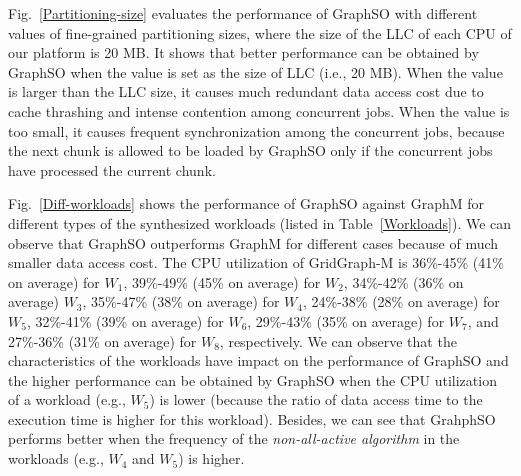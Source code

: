 \documentclass[10pt,journal,compsoc]{IEEEtran}
\begin{document}
Fig.~\ref{Partitioning-size} evaluates the performance of GraphSO with different values of fine-grained partitioning sizes, where the size of the LLC of each CPU of our platform is 20 MB. It shows that better performance can be obtained by GraphSO when the value is set as the size of LLC (i.e., 20 MB). When the value is larger than the LLC size, it causes much redundant data access cost due to cache thrashing and intense contention among concurrent jobs. When the value is too small, it causes frequent synchronization among the concurrent jobs, because the next chunk is allowed to be loaded by GraphSO only if the concurrent jobs have processed the current chunk.

Fig.~\ref{Diff-workloads} shows the performance of GraphSO against GraphM for different types of the synthesized workloads (listed in Table~\ref{Workloads}). We can observe that GraphSO outperforms GraphM for different cases because of much smaller data access cost. 
The CPU utilization of GridGraph-M is 36\%-45\% (41\% on average) for $W_1$, 39\%-49\% (45\% on average) for $W_2$, 34\%-42\% (36\% on average) $W_3$, 35\%-47\% (38\% on average) for $W_4$, 24\%-38\% (28\% on average) for $W_5$, 32\%-41\% (39\% on average) for $W_6$, 29\%-43\% (35\% on average) for $W_7$, and 27\%-36\% (31\% on average) for $W_8$, respectively.
We can observe that the characteristics of the workloads have impact on the performance of GraphSO and the higher performance can be obtained by GraphSO when the CPU utilization of a workload (e.g., $W_5$) is lower (because the ratio of data access time to the execution time is higher for this workload). Besides, we can see that GrahphSO performs better when the frequency of the \textit{non-all-active algorithm} in the workloads (e.g., $W_4$ and $W_5$) is higher.


\vspace{-10pt}
\end{document}
